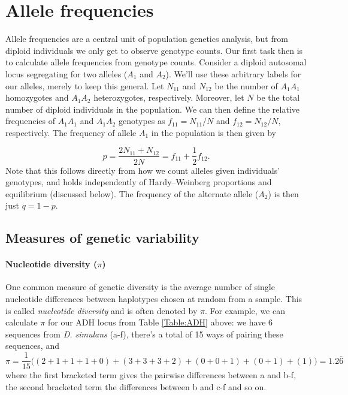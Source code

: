 \section{Allele frequencies}
Allele frequencies are a central unit of population genetics
analysis, but from diploid individuals we only get to observe genotype
counts. Our first task then is to calculate allele frequencies from
genotype counts. Consider a diploid autosomal locus segregating for two alleles ($A_1$ and
$A_2$). We'll use these arbitrary labels for our alleles, merely to keep this
general. Let $N_{11}$ and $N_{12}$ be the number of $A_1A_1$ homozygotes and
$A_1A_2$ heterozygotes, respectively. Moreover, let $N$ be the total number of
diploid individuals in the population. We can then define the relative
frequencies of $A_1A_1$ and $A_1A_2$ genotypes as $f_{11} = N_{11}/N$ and
$f_{12} = N_{12}/N$, respectively. The frequency of allele $A_1$ in the
population is then given by

\begin{equation}
  p = \frac{2 N_{11} + N_{12}}{2N} = f_{11} + \frac{1}{2} f_{12}.
\end{equation}
Note that this follows directly from how we count alleles given individuals'
genotypes, and holds independently of Hardy--Weinberg proportions and
equilibrium (discussed below). The frequency of the alternate allele ($A_2$) is
then just $q=1-p$.

\subsection{Measures of genetic variability}
\paragraph{Nucleotide diversity ($\pi$)}
One common measure of genetic diversity is the average number of single
nucleotide differences between haplotypes chosen at random from a
sample. This is called \emph{nucleotide diversity} and is often denoted by
$\pi$.
For example, we can calculate $\pi$ for our ADH locus from Table \ref{Table:ADH} above: we have
6 sequences from \textit{D. simulans}  (a-f), there's a total of 15 ways of pairing
these sequences, and
\begin{equation}
\pi=\frac{1}{15} \big( (2 + 1 + 1 + 1 + 0 ) + (3 + 3 + 3 + 2 ) +(0 + 0 + 1) + (0 + 1) + (1)  \big)=1.2\overline{6}
\end{equation}
where the first bracketed term gives the pairwise differences between
a and b-f, the second bracketed term the differences between b and c-f
and so on. \\

